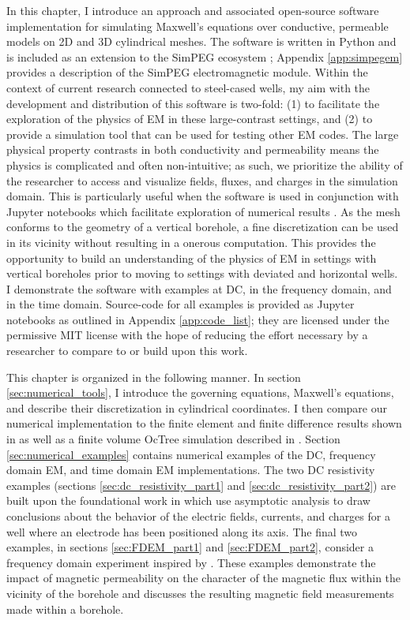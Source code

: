 In this chapter, I introduce an approach and associated open-source software implementation for simulating Maxwell's equations over conductive, permeable models on 2D and 3D cylindrical meshes. The software is written in Python \citep{van1995python} and is included as an extension to the SimPEG ecosystem \citep{Cockett2015}; Appendix \ref{app:simpegem} provides a description of the SimPEG electromagnetic module. Within the context of current research connected to steel-cased wells, my aim with the development and distribution of this software is two-fold: (1) to facilitate the exploration of the physics of EM in these large-contrast settings, and (2) to provide a simulation tool that can be used for testing other EM codes. The large physical property contrasts in both conductivity and permeability means the physics is complicated and often non-intuitive; as such, we prioritize the ability of the researcher to access and visualize fields, fluxes, and charges in the simulation domain. This is particularly useful when the software is used in conjunction with Jupyter notebooks which facilitate exploration of numerical results \citep{Perez2015}. As the mesh conforms to the geometry of a vertical borehole, a fine discretization can be used in its vicinity without resulting in a onerous computation. This provides the opportunity to build an understanding of the physics of EM in settings with vertical boreholes prior to moving to settings with deviated and horizontal wells. I demonstrate the software with examples at DC, in the frequency domain, and in the time domain. Source-code for all examples is provided as Jupyter notebooks as outlined in Appendix \ref{app:code_list}; they are licensed under the permissive MIT license with the hope of reducing the effort necessary by a researcher to compare to or build upon this work.

This chapter is organized in the following manner. In section \ref{sec:numerical_tools}, I introduce the governing equations, Maxwell's equations, and describe their discretization in cylindrical coordinates. I then compare our numerical implementation to the finite element and finite difference results shown in \citep{Commer2015} as well as a finite volume OcTree simulation described in \citep{Haber2007}. Section \ref{sec:numerical_examples} contains numerical examples of the DC, frequency domain EM, and time domain EM implementations. The two DC resistivity examples (sections \ref{sec:dc_resistivity_part1} and \ref{sec:dc_resistivity_part2}) are built upon the foundational work in \citep{Kaufman1990, Kaufman1993} which use asymptotic analysis to draw conclusions about the behavior of the electric fields, currents, and charges for a well where an electrode has been positioned along its axis.  The final two examples, in sections \ref{sec:FDEM_part1} and \ref{sec:FDEM_part2}, consider a frequency domain experiment inspired by \citep{Augustin1989}. These examples demonstrate the impact of magnetic permeability on the character of the magnetic flux within the vicinity of the borehole and discusses the resulting magnetic field measurements made within a borehole.

